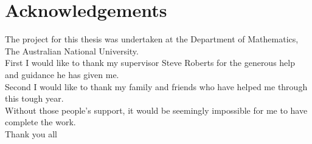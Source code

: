 
\chapter*{Acknowledgements}\label{acknowledgements}


The project for this thesis was undertaken at the Department of Mathematics, The Australian National University.\\

First I would like to thank my supervisor Steve Roberts for the generous help and guidance he has given me. \\

Second I would like to thank my family and friends who have helped me through this tough year.\\

Without those people's support, it would be seemingly impossible for me to have complete the work.\\

Thank you all
